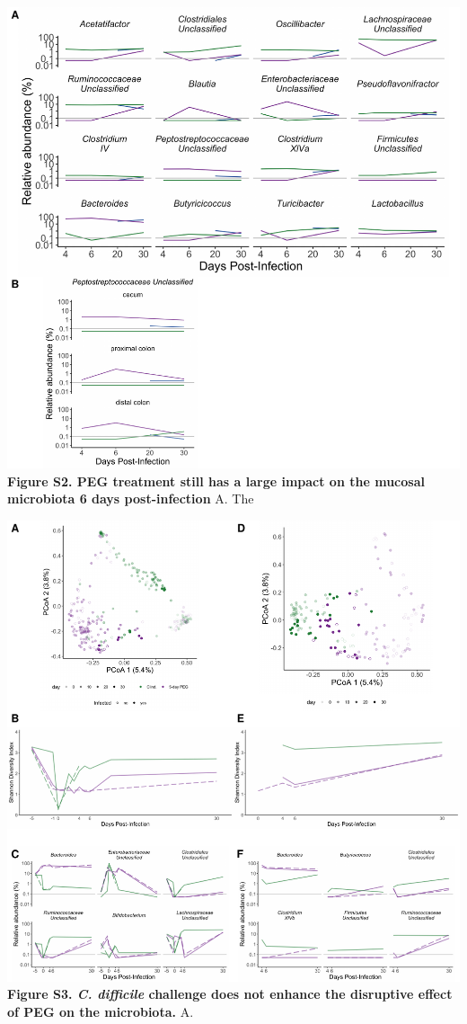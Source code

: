 \documentclass[
  11pt,
]{article}
\begin{document}
\includegraphics{figure_S2.pdf} \textbf{Figure S2. PEG treatment still
has a large impact on the mucosal microbiota 6 days post-infection} A.
The\\
\newpage

\includegraphics{figure_S3.pdf} \textbf{Figure S3. \emph{C. difficile}
challenge does not enhance the disruptive effect of PEG on the
microbiota.} A. \newpage
\end{document}
